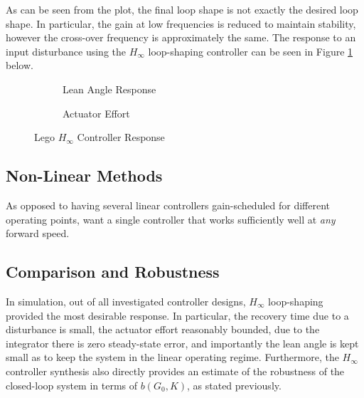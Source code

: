 As can be seen from the plot, the final loop shape is not exactly the desired loop shape. In particular, the gain at low frequencies is reduced to maintain stability, however the cross-over frequency is approximately the same. The response to an input disturbance using the $H_{\infty}$ loop-shaping controller can be seen in Figure \ref{fig:hinfLegoResp} below.

\begin{figure}[H]
	\begin{subfigure}{0.5\textwidth}
	\caption{Lean Angle Response}
	\end{subfigure} \hspace{1mm}
	\begin{subfigure}{0.5\textwidth}
	\caption{Actuator Effort}
	\end{subfigure}
	\caption{Lego $H_{\infty}$ Controller Response}
	\label{fig:hinfLegoResp}
\end{figure}

\subsection{Non-Linear Methods}
As opposed to having several linear controllers gain-scheduled for different operating points, want a single controller that works sufficiently well at \textit{any} forward speed.

\subsection{Comparison and Robustness}
In simulation, out of all investigated controller designs, $H_{\infty}$ loop-shaping provided the most desirable response. In particular, the recovery time due to a disturbance is small, the actuator effort reasonably bounded, due to the integrator there is zero steady-state error, and importantly the lean angle is kept small as to keep the system in the linear operating regime. Furthermore, the $H_{\infty}$ controller synthesis also directly provides an estimate of the robustness of the closed-loop system in terms of $b(G_0,K)$, as stated previously. \\

